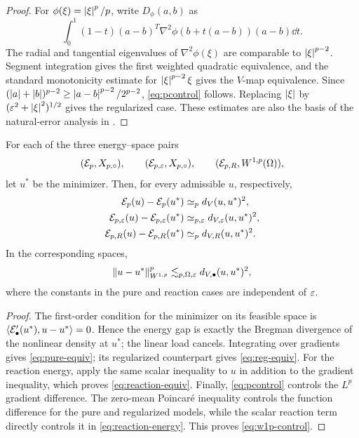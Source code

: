 \begin{proof}
For \(\phi(\xi)=\left\lvert \xi\right\rvert^p/p\), write \(D_\phi(a,b)\) as
\[
 \int_0^1(1-t)(a-b)^T\nabla^2\phi(b+t(a-b))(a-b)\dd t.
\]
The radial and tangential eigenvalues of \(\nabla^2\phi(\xi)\) are comparable to
\(\left\lvert \xi\right\rvert^{p-2}\). Segment integration gives the first weighted quadratic equivalence, and the standard
monotonicity estimate for \(\left\lvert \xi\right\rvert^{p-2}\xi\) gives the \(V\)-map equivalence. Since
\((\left\lvert a\right\rvert+\left\lvert b\right\rvert)^{p-2}\geq\left\lvert a-b\right\rvert^{p-2}/2^{p-2}\), \cref{eq:pcontrol} follows. Replacing
\(\left\lvert \xi\right\rvert\) by \((\varepsilon^2+\left\lvert \xi\right\rvert^2)^{1/2}\) gives the regularized case. These estimates are also the
basis of the natural-error analysis in \citet{BarrettLiu1993,DieningKreuzer2008}.
\end{proof}

\begin{theorem}
\label{thm:energy-v}
For each of the three energy--space pairs
\[
 (\mathcal{E}_p,X_{p,\circ}),\qquad(\mathcal{E}_{p,\varepsilon},X_{p,\circ}),\qquad
 (\mathcal{E}_{p,R},W^{1,p}(\Omega)),
\]
let \(u^*\) be the minimizer. Then, for every admissible \(u\), respectively,
\begin{align}
 \mathcal{E}_p(u)-\mathcal{E}_p(u^*)&\simeq_p d_V(u,u^*)^2,
 \label{eq:pure-equiv}\\
 \mathcal{E}_{p,\varepsilon}(u)-\mathcal{E}_{p,\varepsilon}(u^*)&\simeq_{p,\varepsilon}d_{V,\varepsilon}(u,u^*)^2,
 \label{eq:reg-equiv}\\
 \mathcal{E}_{p,R}(u)-\mathcal{E}_{p,R}(u^*)&\simeq_p d_{V,R}(u,u^*)^2.
 \label{eq:reaction-equiv}
\end{align}
In the corresponding spaces,
\begin{equation}
 \left\lVert u-u^*\right\rVert_{W^{1,p}}^p
 \lesssim_{p,\Omega,\varepsilon}d_{V,\bullet}(u,u^*)^2,
 \label{eq:w1p-control}
\end{equation}
where the constants in the pure and reaction cases are independent of \(\varepsilon\).
\end{theorem}

\begin{proof}
The first-order condition for the minimizer on its feasible space is
\(\left\langle \mathcal{E}_\bullet'(u^*),u-u^*\right\rangle=0\). Hence the energy gap is exactly the Bregman divergence of the
nonlinear density at \(u^*\); the linear load cancels. Integrating  over gradients
gives \cref{eq:pure-equiv}; its regularized counterpart gives \cref{eq:reg-equiv}. For the reaction
energy, apply the same scalar inequality to \(u\) in addition to the gradient inequality, which proves
\cref{eq:reaction-equiv}. Finally, \cref{eq:pcontrol} controls the \(L^p\) gradient difference. The
zero-mean Poincar\'e inequality controls the function difference for the pure and regularized models,
while the scalar reaction term directly controls it in \cref{eq:reaction-energy}. This proves
\cref{eq:w1p-control}.
\end{proof}


